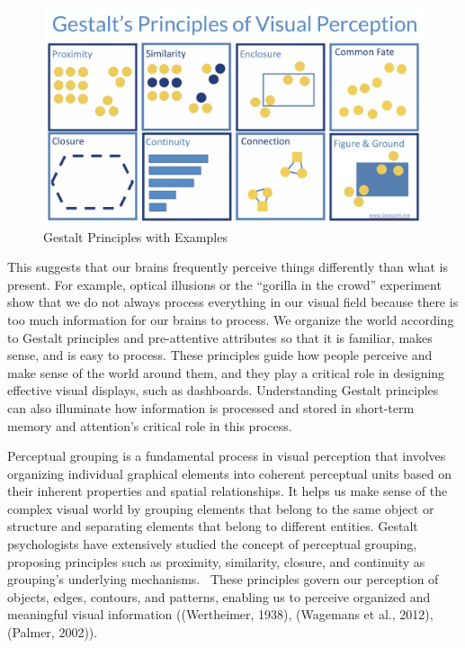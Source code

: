\documentclass[print]{nuthesis}
\begin{document}
\begin{figure}

{\centering \includegraphics[width=0.75\linewidth]{figure/GestaltPrinciplesofVisualPerception} 

}

\caption{Gestalt Principles with Examples}\label{fig:gestalt}
\end{figure}

This suggests that our brains frequently perceive things differently than what is present.
For example, optical illusions or the ``gorilla in the crowd'' experiment show that we do not always process everything in our visual field because there is too much information for our brains to process.
We organize the world according to Gestalt principles and pre-attentive attributes so that it is familiar, makes sense, and is easy to process.
These principles guide how people perceive and make sense of the world around them, and they play a critical role in designing effective visual displays, such as dashboards.
Understanding Gestalt principles can also illuminate how information is processed and stored in short-term memory and attention's critical role in this process.

Perceptual grouping is a fundamental process in visual perception that involves organizing individual graphical elements into coherent perceptual units based on their inherent properties and spatial relationships.
It helps us make sense of the complex visual world by grouping elements that belong to the same object or structure and separating elements that belong to different entities. Gestalt psychologists have extensively studied the concept of perceptual grouping, proposing principles such as proximity, similarity, closure, and continuity as grouping's underlying mechanisms.~
These principles govern our perception of objects, edges, contours, and patterns, enabling us to perceive organized and meaningful visual information ((Wertheimer, 1938), (Wagemans et al., 2012), (Palmer, 2002)).
\end{document}

